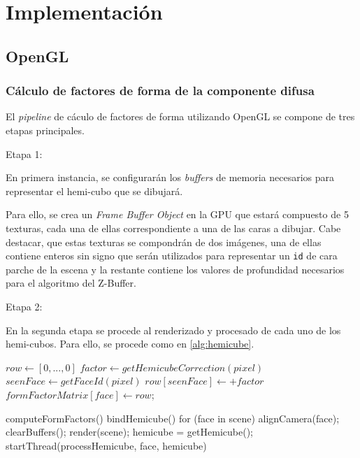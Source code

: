 \chapter{Implementación}
\label{ch:chap04}

\section{OpenGL}
\label{sec:opengl-impl}

\subsection{Cálculo de factores de forma de la componente difusa}

El \textit{pipeline} de cáculo de factores de forma utilizando OpenGL se compone de tres etapas principales.

Etapa 1:

En primera instancia, se configurarán los \textit{buffers} de memoria necesarios para representar el hemi-cubo que se dibujará.

Para ello, se crea un \textit{Frame Buffer Object} en la GPU que estará compuesto de 5 texturas, cada una de ellas correspondiente a una de las caras a dibujar. Cabe destacar, que estas texturas se compondrán de dos imágenes, una de ellas contiene enteros sin signo que serán utilizados para representar un \verb|id| de cara parche de la escena y la restante contiene los valores de profundidad necesarios para el algoritmo del Z-Buffer.

Etapa 2:

En la segunda etapa se procede al renderizado y procesado de cada uno de los hemi-cubos. Para ello, se procede como en \ref{alg:hemicube}.

\begin{minipage}{\linewidth}
	\label{alg:hemicube}
	\begin{algorithmic}[H]
			\State $row \gets [0,...,0]$
				\State $factor \gets getHemicubeCorrection(pixel)$
				\State $seenFace \gets getFaceId(pixel)$
					\State $row[seenFace] \gets + factor$
					\State $formFactorMatrix[face] \gets  row$;
			\EndLoop
		\EndFunction
		
		computeFormFactors() {
			bindHemicube()
			for (face in scene){
				alignCamera(face);
				clearBuffers();
				render(scene);
				hemicube = getHemicube();
				startThread(processHemicube, face, hemicube)
			}
		}
		
	\end{algorithmic}
\end{minipage}

